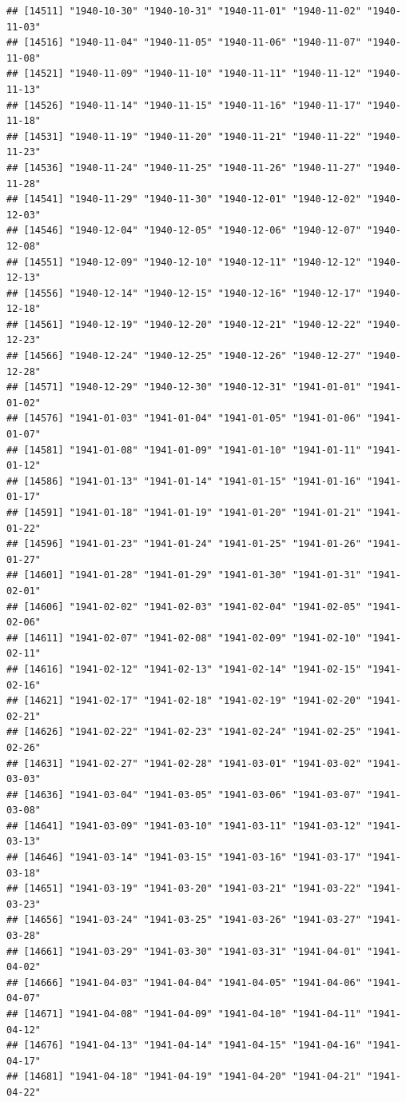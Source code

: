 \documentclass{article}\usepackage[]{graphicx}\usepackage[]{color}
\makeatletter
\newenvironment{kframe}{%
 \def\at@end@of@kframe{}%
 \ifinner\ifhmode%
  \def\at@end@of@kframe{\end{minipage}}%
  \begin{minipage}{\columnwidth}%
 \fi\fi%
 \def\FrameCommand##1{\hskip\@totalleftmargin \hskip-\fboxsep
 \colorbox{shadecolor}{##1}\hskip-\fboxsep
     \hskip-\linewidth \hskip-\@totalleftmargin \hskip\columnwidth}%
 \MakeFramed {\advance\hsize-\width
   \@totalleftmargin\z@ \linewidth\hsize
   \@setminipage}}%
 {\par\unskip\endMakeFramed%
 \at@end@of@kframe}
\newenvironment{knitrout}{}{} %
\makeatother
\begin{document}
\begin{description}
\begin{knitrout}
\begin{kframe}
\begin{verbatim}
## [14511] "1940-10-30" "1940-10-31" "1940-11-01" "1940-11-02" "1940-11-03"
## [14516] "1940-11-04" "1940-11-05" "1940-11-06" "1940-11-07" "1940-11-08"
## [14521] "1940-11-09" "1940-11-10" "1940-11-11" "1940-11-12" "1940-11-13"
## [14526] "1940-11-14" "1940-11-15" "1940-11-16" "1940-11-17" "1940-11-18"
## [14531] "1940-11-19" "1940-11-20" "1940-11-21" "1940-11-22" "1940-11-23"
## [14536] "1940-11-24" "1940-11-25" "1940-11-26" "1940-11-27" "1940-11-28"
## [14541] "1940-11-29" "1940-11-30" "1940-12-01" "1940-12-02" "1940-12-03"
## [14546] "1940-12-04" "1940-12-05" "1940-12-06" "1940-12-07" "1940-12-08"
## [14551] "1940-12-09" "1940-12-10" "1940-12-11" "1940-12-12" "1940-12-13"
## [14556] "1940-12-14" "1940-12-15" "1940-12-16" "1940-12-17" "1940-12-18"
## [14561] "1940-12-19" "1940-12-20" "1940-12-21" "1940-12-22" "1940-12-23"
## [14566] "1940-12-24" "1940-12-25" "1940-12-26" "1940-12-27" "1940-12-28"
## [14571] "1940-12-29" "1940-12-30" "1940-12-31" "1941-01-01" "1941-01-02"
## [14576] "1941-01-03" "1941-01-04" "1941-01-05" "1941-01-06" "1941-01-07"
## [14581] "1941-01-08" "1941-01-09" "1941-01-10" "1941-01-11" "1941-01-12"
## [14586] "1941-01-13" "1941-01-14" "1941-01-15" "1941-01-16" "1941-01-17"
## [14591] "1941-01-18" "1941-01-19" "1941-01-20" "1941-01-21" "1941-01-22"
## [14596] "1941-01-23" "1941-01-24" "1941-01-25" "1941-01-26" "1941-01-27"
## [14601] "1941-01-28" "1941-01-29" "1941-01-30" "1941-01-31" "1941-02-01"
## [14606] "1941-02-02" "1941-02-03" "1941-02-04" "1941-02-05" "1941-02-06"
## [14611] "1941-02-07" "1941-02-08" "1941-02-09" "1941-02-10" "1941-02-11"
## [14616] "1941-02-12" "1941-02-13" "1941-02-14" "1941-02-15" "1941-02-16"
## [14621] "1941-02-17" "1941-02-18" "1941-02-19" "1941-02-20" "1941-02-21"
## [14626] "1941-02-22" "1941-02-23" "1941-02-24" "1941-02-25" "1941-02-26"
## [14631] "1941-02-27" "1941-02-28" "1941-03-01" "1941-03-02" "1941-03-03"
## [14636] "1941-03-04" "1941-03-05" "1941-03-06" "1941-03-07" "1941-03-08"
## [14641] "1941-03-09" "1941-03-10" "1941-03-11" "1941-03-12" "1941-03-13"
## [14646] "1941-03-14" "1941-03-15" "1941-03-16" "1941-03-17" "1941-03-18"
## [14651] "1941-03-19" "1941-03-20" "1941-03-21" "1941-03-22" "1941-03-23"
## [14656] "1941-03-24" "1941-03-25" "1941-03-26" "1941-03-27" "1941-03-28"
## [14661] "1941-03-29" "1941-03-30" "1941-03-31" "1941-04-01" "1941-04-02"
## [14666] "1941-04-03" "1941-04-04" "1941-04-05" "1941-04-06" "1941-04-07"
## [14671] "1941-04-08" "1941-04-09" "1941-04-10" "1941-04-11" "1941-04-12"
## [14676] "1941-04-13" "1941-04-14" "1941-04-15" "1941-04-16" "1941-04-17"
## [14681] "1941-04-18" "1941-04-19" "1941-04-20" "1941-04-21" "1941-04-22"

\end{verbatim}
\end{kframe}
\end{knitrout}
\end{description}
\end{document}
